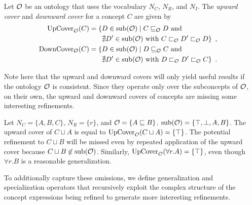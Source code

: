 \begin{definition} \label{def:alc-covers}
  Let $\mathcal{O}$ be an \ALC ontology that uses the vocabulary $N_C$, $N_R$, and $N_I$. The \emph{upward cover} and \emph{downward cover} for a concept $C$ are given by
  \begin{align*}
    {\ensuremath{\operatorname{UpCover}}}_\mathcal{O}(C) = \{ & D \in {\ensuremath{\operatorname{sub}}}(\mathcal{O}) \mid C \sqsubseteq_\mathcal{O} D \text{ and } \\
    & \nexists D' \in {\ensuremath{\operatorname{sub}}}(\mathcal{O}) \text{ with } C \sqsubset_\mathcal{O} D' \sqsubset_\mathcal{O} D \} \enspace, \\
    {\operatorname{DownCover}}_\mathcal{O}(C) = \{ & D \in {\ensuremath{\operatorname{sub}}}(\mathcal{O}) \mid D \sqsubseteq_\mathcal{O} C \text{ and } \\
    & \nexists D' \in {\ensuremath{\operatorname{sub}}}(\mathcal{O}) \text{ with } D \sqsubset_\mathcal{O} D' \sqsubset_\mathcal{O} C \} \enspace.
  \end{align*}
\end{definition}

Note here that the upward and downward covers will only yield useful results if the ontology $\mathcal{O}$ is consistent. Since they operate only over the subconcepts of $\mathcal{O}$, on their own, the upward and downward covers of concepts are missing some interesting refinements.
\begin{example} \label{ex:up-cover-alc}
  Let $N_C = \{ A, B, C \}$, $N_R = \{ r \}$, and $\mathcal{O} = \{ A \sqsubseteq B \}$. ${\operatorname{sub}}(\mathcal{O}) = \{\top, \bot, A, B\}$. The upward cover of $C \sqcup A$ is equal to ${\operatorname{UpCover}}_\mathcal{O}(C \sqcup A) = \{ \top \}$. The potential refinement to $C \sqcup B$ will be missed even by repeated application of the upward cover because $C \sqcup B \not\in {\ensuremath{\operatorname{sub}}}(\mathcal{O})$. Similarly, ${\operatorname{UpCover}}_\mathcal{O}(\forall r.A) = \{ \top \}$, even though $\forall r.B$ is a reasonable generalization.
\end{example}

To additionally capture these omissions, we define generalization and specialization operators that recursively exploit the complex structure of the concept expressions being refined to generate more interesting refinements.

